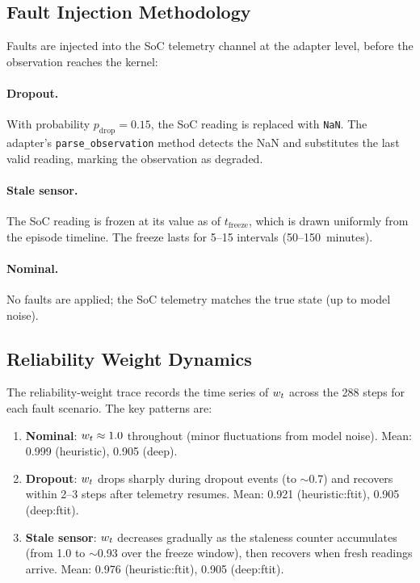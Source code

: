 \subsection{Fault Injection Methodology}

Faults are injected into the SoC telemetry channel at the adapter level, before
the observation reaches the \dcs{} kernel:

\paragraph{Dropout.}  With probability $p_{\mathrm{drop}} = 0.15$, the SoC reading
is replaced with \texttt{NaN}.  The adapter's \texttt{parse\_observation} method
detects the NaN and substitutes the last valid reading, marking the observation as
degraded.

\paragraph{Stale sensor.}  The SoC reading is frozen at its value as of
$t_{\mathrm{freeze}}$, which is drawn uniformly from the episode timeline.  The
freeze lasts for 5--15 intervals (50--150~minutes).

\paragraph{Nominal.}  No faults are applied; the SoC telemetry matches the true
state (up to model noise).

\subsection{Reliability Weight Dynamics}

The reliability-weight trace records the time series of $w_t$ across the 288 steps
for each fault scenario.  The key patterns are:

\begin{enumerate}[nosep]
  \item \textbf{Nominal}: $w_t \approx 1.0$ throughout (minor fluctuations from
        model noise).  Mean: 0.999 (heuristic), 0.905 (deep).
  \item \textbf{Dropout}: $w_t$ drops sharply during dropout events (to $\sim$0.7)
        and recovers within 2--3 steps after telemetry resumes.  Mean: 0.921
        (heuristic:ftit), 0.905 (deep:ftit).
  \item \textbf{Stale sensor}: $w_t$ decreases gradually as the staleness counter
        accumulates (from 1.0 to $\sim$0.93 over the freeze window), then recovers
        when fresh readings arrive.  Mean: 0.976 (heuristic:ftit), 0.905 (deep:ftit).
\end{enumerate}


